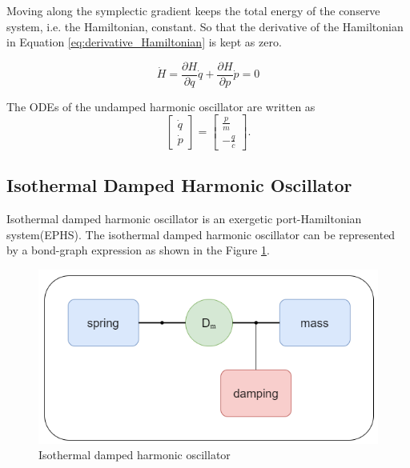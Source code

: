 Moving along the symplectic gradient keeps the total energy of the conserve system, i.e. the Hamiltonian, constant. So that the derivative of the Hamiltonian in Equation \ref{eq:derivative_Hamiltonian} is kept as zero.

\begin{equation}
    \label{eq:derivative_Hamiltonian}
    \dot{H}=\frac{\partial H}{\partial q}\dot{q}+\frac{\partial H}{\partial p}\dot{p}=0
\end{equation}

The ODEs of the undamped harmonic oscillator are written as
\begin{equation}
    \label{eq:ODE_undamped_harmonic_oscillator}
    \begin{bmatrix}
    \dot{q}\\
    \dot{p}
    \end{bmatrix}
    =
    \begin{bmatrix}
    \frac{p}{m}\\
    -\frac{q}{c}
    \end{bmatrix}.
\end{equation}


\subsection{Isothermal Damped Harmonic Oscillator}
Isothermal damped harmonic oscillator is an exergetic port-Hamiltonian system(EPHS). The isothermal damped harmonic oscillator can be represented by a bond-graph expression as shown in the Figure \ref{fig:isothermal_damped_harmonic_oscillator}.

\begin{figure}[h!]
    \centering
    \includegraphics[scale=0.5]{figures/1_Physical_Model/2_isothermal_damped_harmonic_oscillator.png}
    \caption{Isothermal damped harmonic oscillator}
    \label{fig:isothermal_damped_harmonic_oscillator}
\end{figure}


